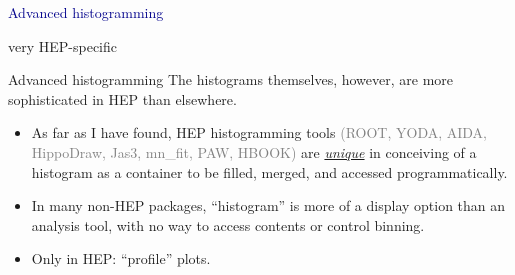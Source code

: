 \documentclass[aspectratio=169]{beamer}
\begin{document}

\begin{frame}{}
\huge
\vspace{0.5 cm}
\begin{center}
\textcolor{darkblue}{Advanced histogramming}

\large
\vspace{0.5 cm}
very HEP-specific
\end{center}
\end{frame}

\begin{frame}{Advanced histogramming}
\Large
\vspace{0.5 cm}
The histograms themselves, however, are more sophisticated in HEP than elsewhere.

\large
\vspace{0.35 cm}
\begin{itemize}\setlength{\itemsep}{0.35 cm}
\item<2-> As far as I have found, HEP histogramming tools \textcolor{gray}{(ROOT, YODA, AIDA, HippoDraw, Jas3, mn\_fit, PAW, HBOOK)} are \underline{\it unique} in conceiving of a histogram as a container to be filled, merged, and accessed programmatically.
\item<3-> In many non-HEP packages, ``histogram'' is more of a display option than an analysis tool, with no way to access contents or control binning.
\item<4-> Only in HEP: ``profile'' plots.
\end{itemize}
\begin{center}
\end{center}
\end{frame}
\end{document}
